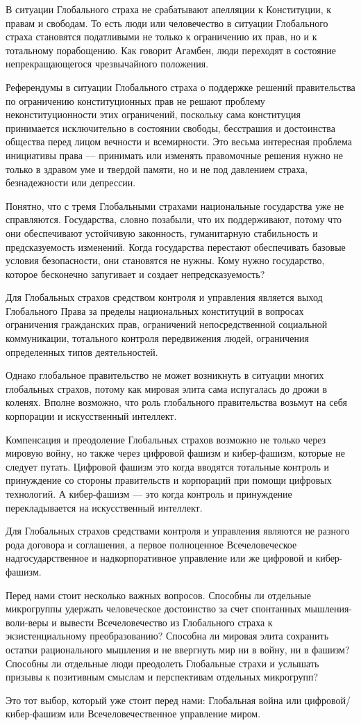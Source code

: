 В ситуации Глобального страха не срабатывают апелляции к Конституции, к правам
и свободам. То есть люди или человечество в ситуации Глобального страха
становятся податливыми не только к ограничению их прав, но и к тотальному
порабощению. Как говорит Агамбен, люди переходят в состояние непрекращающегося
чрезвычайного положения.

Референдумы в ситуации Глобального страха о поддержке решений правительства по
ограничению конституционных прав не решают проблему неконституционности этих
ограничений, поскольку сама конституция принимается исключительно в состоянии
свободы, бесстрашия и достоинства общества перед лицом вечности и всемирности.
Это весьма интересная проблема инициативы права — принимать или изменять
правомочные решения нужно не только в здравом уме и твердой памяти, но и не под
давлением страха, безнадежности или депрессии.

Понятно, что с тремя Глобальными страхами национальные государства уже не
справляются. Государства, словно позабыли, что их поддерживают, потому что они
обеспечивают устойчивую законность, гуманитарную стабильность и предсказуемость
изменений. Когда государства перестают обеспечивать базовые условия
безопасности, они становятся не нужны. Кому нужно государство, которое
бесконечно запугивает и создает непредсказуемость?

Для Глобальных страхов средством контроля и управления является выход
Глобального Права за пределы национальных конституций в вопросах ограничения
гражданских прав, ограничений непосредственной социальной коммуникации,
тотального контроля передвижения людей, ограничения определенных типов
деятельностей.

Однако глобальное правительство не может возникнуть в ситуации многих
глобальных страхов, потому как мировая элита сама испугалась до дрожи в
коленях. Вполне возможно, что роль глобального правительства возьмут на себя
корпорации и искусственный интеллект.

Компенсация и преодоление Глобальных страхов возможно не только через мировую
войну, но также через цифровой фашизм и кибер-фашизм, которые не следует
путать. Цифровой фашизм это когда вводятся тотальные контроль и принуждение со
стороны правительств и корпораций при помощи цифровых технологий. А
кибер-фашизм — это когда контроль и принуждение перекладывается на
искусственный интеллект.

Для Глобальных страхов средствами контроля и управления являются не разного
рода договора и соглашения, а первое полноценное Всечеловеческое
надгосударственное и надкорпоративное управление или же цифровой и
кибер-фашизм.

Перед нами стоит несколько важных вопросов. Способны ли отдельные микрогруппы
удержать человеческое достоинство за счет спонтанных мышления-воли-веры и
вывести Всечеловечество из Глобального страха к экзистенциальному
преобразованию? Способна ли мировая элита сохранить остатки рационального
мышления и не ввергнуть мир ни в войну, ни в фашизм? Способны ли отдельные люди
преодолеть Глобальные страхи и услышать призывы к позитивным смыслам и
перспективам отдельных микрогрупп?

Это тот выбор, который уже стоит перед нами: Глобальная война или
цифровой/кибер-фашизм или Всечеловечественное управление миром.
